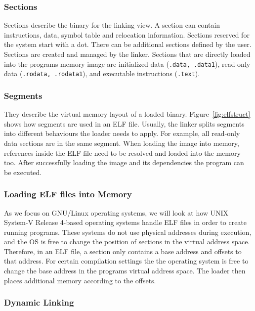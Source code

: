 \subsubsection{Sections}

Sections describe the binary for the linking view. A section can contain
instructions, data, symbol table and relocation information. Sections reserved
for the system start with a dot. There can be additional sections defined by
the user. Sections are created and managed by the linker. Sections that are
directly loaded into the program\textquotesingle s memory image are initialized
data (\texttt{.data, .data1}), read-only data (\texttt{.rodata, .rodata1}), and
executable instructions (\texttt{.text}).

\subsubsection{Segments}

They describe the virtual memory layout of a loaded binary.
Figure~\ref{fig:elfstruct} shows how segments are used in an ELF file.
Usually, the linker splits segments into different behaviours the loader needs
to apply. For example, all read-only data sections are in the same segment. When
loading the image into memory, references inside the ELF file need to be
resolved and loaded into the memory too. After successfully loading the image
and its dependencies the program can be executed.

\subsubsection{Loading ELF files into Memory}

As we focus on GNU/Linux operating systems, we will look at how UNIX System-V
Release 4-based operating systems handle ELF files in order to create running
programs. These systems do not use physical addresses during execution, and
the OS is free to change the position of sections in the virtual address space.
Therefore, in an ELF file, a section only contains a base address and offsets
to that address. For certain compilation settings the the operating system is
free to change the base address in the programs virtual address space. The
loader then places additional memory according to the offsets.

\subsubsection{Dynamic Linking}

